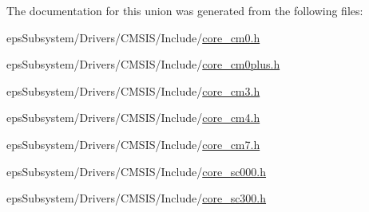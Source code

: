 The documentation for this union was generated from the following files\-:\begin{DoxyCompactItemize}
\item 
eps\-Subsystem/\-Drivers/\-C\-M\-S\-I\-S/\-Include/\hyperlink{core__cm0_8h}{core\-\_\-cm0.\-h}\item 
eps\-Subsystem/\-Drivers/\-C\-M\-S\-I\-S/\-Include/\hyperlink{core__cm0plus_8h}{core\-\_\-cm0plus.\-h}\item 
eps\-Subsystem/\-Drivers/\-C\-M\-S\-I\-S/\-Include/\hyperlink{core__cm3_8h}{core\-\_\-cm3.\-h}\item 
eps\-Subsystem/\-Drivers/\-C\-M\-S\-I\-S/\-Include/\hyperlink{core__cm4_8h}{core\-\_\-cm4.\-h}\item 
eps\-Subsystem/\-Drivers/\-C\-M\-S\-I\-S/\-Include/\hyperlink{core__cm7_8h}{core\-\_\-cm7.\-h}\item 
eps\-Subsystem/\-Drivers/\-C\-M\-S\-I\-S/\-Include/\hyperlink{core__sc000_8h}{core\-\_\-sc000.\-h}\item 
eps\-Subsystem/\-Drivers/\-C\-M\-S\-I\-S/\-Include/\hyperlink{core__sc300_8h}{core\-\_\-sc300.\-h}\end{DoxyCompactItemize}
